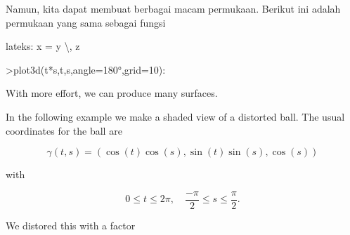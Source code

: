 \documentclass[a4paper,10pt]{article}
\begin{document}
\begin{eulernotebook}
\begin{eulercomment}
\begin{eulercomment}
\begin{eulercomment}
\begin{eulercomment}
\begin{eulercomment}
\begin{eulercomment}
\begin{eulercomment}
\begin{eulercomment}
\begin{eulercomment}
\begin{eulercomment}
\begin{eulercomment}
\begin{eulercomment}
\begin{eulercomment}
\begin{eulercomment}
\begin{eulercomment}
\begin{eulercomment}
\begin{eulercomment}
\begin{eulercomment}
\begin{eulercomment}
\begin{eulercomment}
\begin{eulercomment}
\begin{eulercomment}
\begin{eulercomment}
\begin{eulercomment}
\begin{eulercomment}
\begin{eulercomment}
\begin{eulercomment}
\begin{eulercomment}
\begin{eulercomment}
\begin{eulercomment}
\begin{eulercomment}
\begin{eulercomment}
\begin{eulercomment}
\begin{eulercomment}
\begin{eulercomment}
\begin{eulercomment}
\begin{eulercomment}
\begin{eulercomment}
\begin{eulercomment}
\begin{eulercomment}
\begin{eulercomment}
Namun, kita dapat membuat berbagai macam permukaan. Berikut ini adalah
permukaan yang sama sebagai fungsi

lateks: x = y \textbackslash{}, z
\end{eulercomment}
\begin{eulerprompt}
>plot3d(t*s,t,s,angle=180°,grid=10):
\end{eulerprompt}
\begin{eulercomment}
With more effort, we can produce many surfaces.

In the following example we make a shaded view of a distorted ball. The usual coordinates for the ball are

\end{eulercomment}
\begin{eulerformula}
\[
\gamma(t,s) = (\cos(t)\cos(s),\sin(t)\sin(s),\cos(s))
\]
\end{eulerformula}
\begin{eulercomment}
with

\end{eulercomment}
\begin{eulerformula}
\[
0 \le t \le 2\pi, \quad \frac{-\pi}{2} \le s \le \frac{\pi}{2}.
\]
\end{eulerformula}
\begin{eulercomment}
We distored this with a factor


\end{eulercomment}
\end{eulercomment}
\end{eulercomment}
\end{eulercomment}
\end{eulercomment}
\end{eulercomment}
\end{eulercomment}
\end{eulercomment}
\end{eulercomment}
\end{eulercomment}
\end{eulercomment}
\end{eulercomment}
\end{eulercomment}
\end{eulercomment}
\end{eulercomment}
\end{eulercomment}
\end{eulercomment}
\end{eulercomment}
\end{eulercomment}
\end{eulercomment}
\end{eulercomment}
\end{eulercomment}
\end{eulercomment}
\end{eulercomment}
\end{eulercomment}
\end{eulercomment}
\end{eulercomment}
\end{eulercomment}
\end{eulercomment}
\end{eulercomment}
\end{eulercomment}
\end{eulercomment}
\end{eulercomment}
\end{eulercomment}
\end{eulercomment}
\end{eulercomment}
\end{eulercomment}
\end{eulercomment}
\end{eulercomment}
\end{eulercomment}
\end{eulercomment}
\end{eulernotebook}
\end{document}
